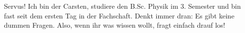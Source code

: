 \begin{multicols*}{2}
{Servus! Ich bin der Carsten, studiere den B.Sc. Physik im 3. Semester und bin fast seit dem ersten Tag in der Fachschaft. Denkt immer dran: Es gibt keine dummen Fragen. Also, wenn ihr was wissen wollt, fragt einfach drauf los!
}	



\end{multicols*}
